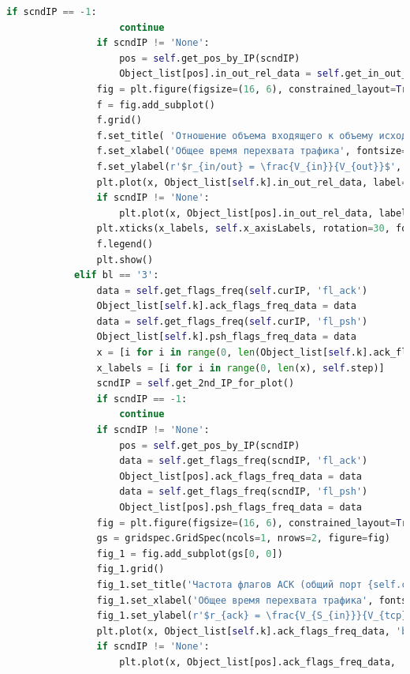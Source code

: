 \documentclass[bachelor, och, coursework]{SCWorks}
\begin{document}
\begin{lstlisting}[language=Python]
                if scndIP == -1:
                    continue
                if scndIP != 'None':
                    pos = self.get_pos_by_IP(scndIP)
                    Object_list[pos].in_out_rel_data = self.get_in_out_rel(scndIP)
                fig = plt.figure(figsize=(16, 6), constrained_layout=True)
                f = fig.add_subplot()
                f.grid()
                f.set_title( 'Отношение объема входящего к объему исходящего трафиков (общий порт {self.curPort})', fontsize=15 )
                f.set_xlabel('Общее время перехвата трафика', fontsize=15)
                f.set_ylabel(r'$r_{in/out} = \frac{V_{in}}{V_{out}}$', fontsize=15)
                plt.plot(x, Object_list[self.k].in_out_rel_data, label=self.curIP)
                if scndIP != 'None':
                    plt.plot(x, Object_list[pos].in_out_rel_data, label=scndIP)
                plt.xticks(x_labels, self.x_axisLabels, rotation=30, fontsize=10)
                f.legend()
                plt.show()
            elif bl == '3':
                data = self.get_flags_freq(self.curIP, 'fl_ack')
                Object_list[self.k].ack_flags_freq_data = data
                data = self.get_flags_freq(self.curIP, 'fl_psh')
                Object_list[self.k].psh_flags_freq_data = data
                x = [i for i in range(0, len(Object_list[self.k].ack_flags_freq_data))]
                x_labels = [i for i in range(0, len(x), self.step)]
                scndIP = self.get_2nd_IP_for_plot()
                if scndIP == -1:
                    continue
                if scndIP != 'None':
                    pos = self.get_pos_by_IP(scndIP)
                    data = self.get_flags_freq(scndIP, 'fl_ack')
                    Object_list[pos].ack_flags_freq_data = data
                    data = self.get_flags_freq(scndIP, 'fl_psh')
                    Object_list[pos].psh_flags_freq_data = data
                fig = plt.figure(figsize=(16, 6), constrained_layout=True)
                gs = gridspec.GridSpec(ncols=1, nrows=2, figure=fig)
                fig_1 = fig.add_subplot(gs[0, 0])
                fig_1.grid()
                fig_1.set_title('Частота флагов ACK (общий порт {self.curPort})', fontsize=15 )
                fig_1.set_xlabel('Общее время перехвата трафика', fontsize=15)
                fig_1.set_ylabel(r'$r_{ack} = \frac{V_{S_{in}}}{V_{tcp}}$', fontsize=15)
                plt.plot(x, Object_list[self.k].ack_flags_freq_data, 'b', label=self.curIP)
                if scndIP != 'None':
                    plt.plot(x, Object_list[pos].ack_flags_freq_data, 'r', label=scndIP)

\end{lstlisting}
\end{document}
